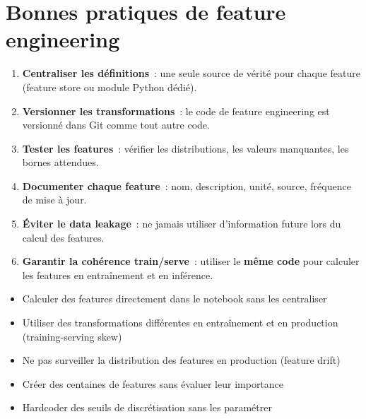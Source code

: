 \section{Bonnes pratiques de feature engineering}
\label{sec:feature-engineering-bp}

\begin{bonnepratique}[title=\textbf{R\`egles d'or du feature engineering}]
\begin{enumerate}
  \item \textbf{Centraliser les d\'efinitions}~: une seule source de
    v\'erit\'e pour chaque feature (feature store ou module Python d\'edi\'e).
  \item \textbf{Versionner les transformations}~: le code de feature
    engineering est versionn\'e dans Git comme tout autre code.
  \item \textbf{Tester les features}~: v\'erifier les distributions,
    les valeurs manquantes, les bornes attendues.
  \item \textbf{Documenter chaque feature}~: nom, description, unit\'e,
    source, fr\'equence de mise \`a jour.
  \item \textbf{\'Eviter le data leakage}~: ne jamais utiliser d'information
    future lors du calcul des features.
  \item \textbf{Garantir la coh\'erence train/serve}~: utiliser le
    \textbf{m\^eme code} pour calculer les features en entra\^inement et
    en inf\'erence.
\end{enumerate}
\end{bonnepratique}

\begin{antipattern}[title=\textbf{Anti-patterns du feature engineering}]
\begin{itemize}
  \item Calculer des features directement dans le notebook sans les
    centraliser
  \item Utiliser des transformations diff\'erentes en entra\^inement et
    en production (training-serving skew)
  \item Ne pas surveiller la distribution des features en production
    (feature drift)
  \item Cr\'eer des centaines de features sans \'evaluer leur importance
  \item Hardcoder des seuils de discr\'etisation sans les param\'etrer
\end{itemize}
\end{antipattern}


